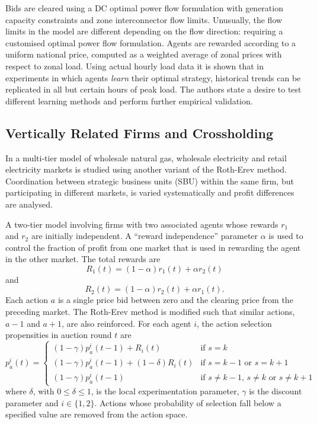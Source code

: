 
Bids are cleared using a DC optimal power flow formulation with generation
capacity constraints and zone interconnector flow limits. Unusually, the flow
limits in the model are different depending on the flow direction: requiring a
customised optimal power flow formulation. Agents are rewarded according to a
uniform national price, computed as a weighted average of zonal prices with
respect to zonal load.  Using actual hourly load data it is shown that in
experiments in which agents \textit{learn} their optimal strategy, historical
trends can be replicated in all but certain hours of peak load.  The authors
state a desire to test different learning methods and perform further empirical
validation.

\subsection{Vertically Related Firms and Crossholding}
In  a multi-tier model of wholesale natural gas, wholesale
electricity and retail electricity markets is studied using another variant of
the Roth-Erev method.  Coordination between strategic business units (SBU)
within the same firm, but participating in different markets, is varied
systematically and profit differences are analysed.

A two-tier model involving firms with two associated agents whose rewards $r_1$
and $r_2$ are initially independent.  A ``reward independence'' parameter
$\alpha$ is used to control the fraction of profit from one market that is used
in rewarding the agent in the other market. The total rewards are
\begin{equation}
R_1(t) = (1-\alpha)r_1(t) + \alpha r_2(t)
\end{equation}
and
\begin{equation}
R_2(t) = (1-\alpha)r_2(t) + \alpha r_1(t).
\end{equation}
Each action $a$ is a single price bid between zero and the clearing price from
the preceding market.  The Roth-Erev method is modified such that similar
actions, $a-1$ and $a+1$, are also reinforced.  For each agent $i$, the
action selection propensities in auction round $t$ are
\begin{equation}
p^i_a(t) = \begin{cases}
(1-\gamma)p^i_a(t-1) + R_i(t)& \text{if $s=k$}\\
(1-\gamma)p^i_a(t-1) + (1-\delta)R_i(t)& \text{if $s=k-1$ or $s=k+1$}\\
(1-\gamma)p^i_a(t-1)& \text{if $s\neq k-1$, $s\neq k$ or $s\neq k+1$}
\end{cases}
\end{equation}
where $\delta$, with $0\leq \delta \leq 1$, is the local experimentation
parameter, $\gamma$ is the discount parameter and $i\in \lbrace 1,2 \rbrace$.
Actions whose probability of selection fall below a specified value are
removed from the action space.

